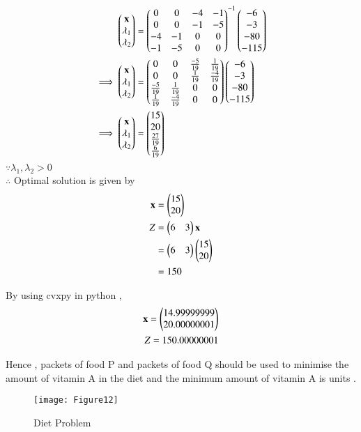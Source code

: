 \documentclass[journal,12pt,twocolumn]{IEEEtran}
\begin{document}
\begin{align}
    \begin{pmatrix}\mathbf{x} \\ \lambda_1 \\ \lambda_2\end{pmatrix} &= \begin{pmatrix}0 & 0 & -4 & -1 \\ 0 & 0 & -1 & -5 \\ -4 & -1 & 0 & 0 \\ -1 & -5 & 0 & 0\end{pmatrix}^{-1}\begin{pmatrix}-6 \\ -3 \\ -80 \\ -115\end{pmatrix}
    \\
    \implies   \begin{pmatrix}\mathbf{x} \\ \lambda_1 \\ \lambda_2\end{pmatrix} &= \begin{pmatrix}0 & 0 & \frac{-5}{19} & \frac{1}{19} \\ 0 & 0 & \frac{1}{19} & \frac{-4}{19} \\ \frac{-5}{19} & \frac{1}{19} & 0 & 0 \\ \frac{1}{19} & \frac{-4}{19} & 0 & 0\end{pmatrix}\begin{pmatrix}-6 \\ -3 \\ -80 \\ -115\end{pmatrix}
    \\
    \implies \begin{pmatrix}\mathbf{x} \\ \lambda_1 \\ \lambda_2 \end{pmatrix} &= \begin{pmatrix}15 \\ 20 \\ \frac{27}{19} \\ \frac{6}{19} \end{pmatrix}
\end{align}
$\because \lambda_1,\lambda_2 > 0 $
\\
$\therefore$ Optimal solution is given by
\begin{align}
    \mathbf{x} &= \begin{pmatrix}15\\20\end{pmatrix} \\
    Z &= \begin{pmatrix}6 & 3\end{pmatrix}\mathbf{x} \\
    &= \begin{pmatrix}6 & 3\end{pmatrix}\begin{pmatrix}15 \\ 20\end{pmatrix} \\
    &= 150
\end{align}

By using cvxpy in python ,
\begin{align}
    \mathbf{x}=\begin{pmatrix}14.99999999\\20.00000001\end{pmatrix}\\
    Z = 150.00000001
\end{align}

Hence , packets of food P and  packets of food Q should be used to minimise the amount of vitamin A in the diet and the minimum amount of vitamin A is  units .

\begin{figure}[!ht]
\centering
\texttt{[image: Figure12]}
\caption{Diet Problem}
\label{fig:diet problem}	
\end{figure}
\end{document}
